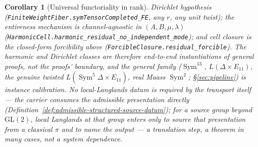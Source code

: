 \documentclass[11pt]{article}
\newtheorem{corollary}[theorem]{Corollary}
\theoremstyle{definition}
\newcommand{\Sym}{\operatorname{Sym}}
\begin{document}
\begin{corollary}[Universal functoriality in rank]
Dirichlet hypothesis (\texttt{FiniteWeightFiber.symTensorCompleted\_FE}, any $r$, any unit
twist); the entireness mechanism is channel-agnostic in $(A,B,\mu,\lambda)$
(\texttt{HarmonicCell.harmonic\_residual\_no\_independent\_mode}); and cell closure is the
closed-form forcibility above (\texttt{ForcibleClosure.residual\_forcible}). The harmonic and Dirichlet
classes are therefore end-to-end \emph{instantiations} of general proofs, not the proofs' boundary, and
the general family ($\Sym^{13}$, $L(\Delta\times E_{11})$, the genuine twisted $L(\Sym^5\Delta\times E_{11})$, real Maass $\Sym^2$;
\S\ref{sec:pipeline}) is instance calibration. No local-Langlands datum is required by the transport
itself --- the carrier consumes the admissible presentation directly
(Definition~\ref{def:admissible-structured-source-datum}); for a source group beyond
$\mathrm{GL}(2)$, local Langlands at that group enters only to source that presentation from a
classical $\pi$ and to name the output --- a translation step, a theorem in many cases, not a system
dependence.
\end{corollary}
\end{document}

